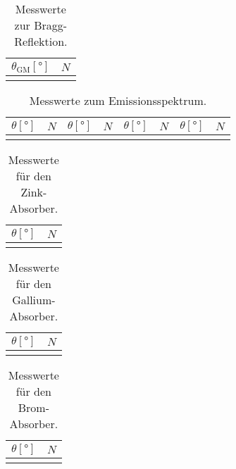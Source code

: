 \begin{table}[H]
  \centering
  \caption{Messwerte zur Bragg-Reflektion.}
  \begin{tabular}{S[table-format=2.1] c}
  \toprule
  {$\theta_\text{GM} [\si{\degree}]$} &
  {$N$} \\
  \midrule
  \bottomrule
  \end{tabular}
\end{table}

\begin{table}[H]
  \centering
  \caption{Messwerte zum Emissionsspektrum.}
  \begin{tabular}{S[table-format=2.1] c | S[table-format=2.1] c | S[table-format=2.1] c | S[table-format=2.1] c}
  \toprule
  {$\theta [\si{\degree}]$} &
  {$N$} &
  {$\theta [\si{\degree}]$} &
  {$N$} &
  {$\theta [\si{\degree}]$} &
  {$N$} &
  {$\theta [\si{\degree}]$} &
  {$N$} \\
  \midrule
  \bottomrule
  \end{tabular}
\end{table}


\begin{table}[H]
  \centering
  \caption{Messwerte für den Zink-Absorber.}
  \begin{tabular}{S[table-format=2.1] c}
  \toprule
  {$\theta [\si{\degree}]$} &
  {$N$} \\
  \midrule
  \bottomrule
  \end{tabular}
\end{table}

\begin{table}[H]
  \centering
  \caption{Messwerte für den Gallium-Absorber.}
  \begin{tabular}{S[table-format=2.1] c}
  \toprule
  {$\theta [\si{\degree}]$} &
  {$N$} \\
  \midrule
  \bottomrule
  \end{tabular}
\end{table}

\begin{table}[H]
  \centering
  \caption{Messwerte für den Brom-Absorber.}
  \begin{tabular}{S[table-format=2.1] c}
  \toprule
  {$\theta [\si{\degree}]$} &
  {$N$} \\
  \midrule
  \bottomrule
  \end{tabular}
\end{table}

